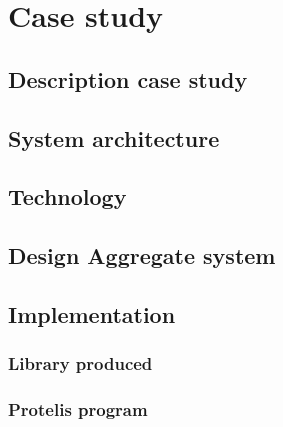 \chapter{Case study}
\label{chap:case-staudy}
\section{Description case study}


\section{System architecture}
\section{Technology}
\section{Design Aggregate system}
\section{Implementation}
\subsection{Library produced}
\subsection{Protelis program}